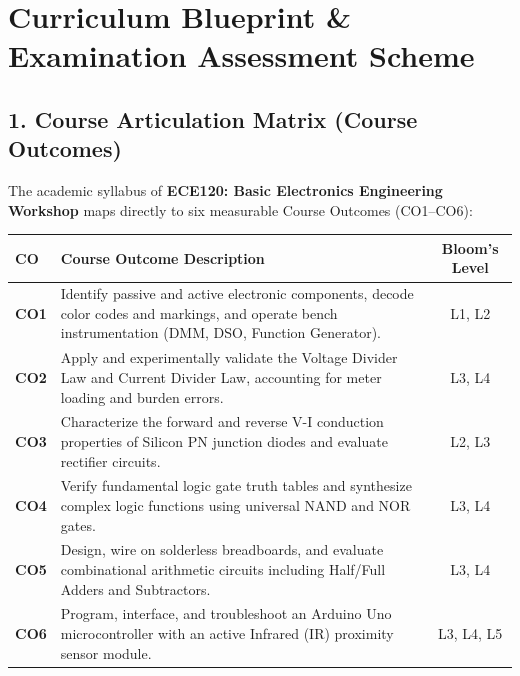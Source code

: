 \chapter*{Curriculum Blueprint \& Examination Assessment Scheme}

\section*{1. Course Articulation Matrix (Course Outcomes)}
The academic syllabus of \textbf{ECE120: Basic Electronics Engineering Workshop} maps directly to six measurable Course Outcomes (CO1--CO6):
\begin{center}
\begin{tabularx}{\textwidth}{lp{9.5cm}c}
\toprule
\textbf{CO} & \textbf{Course Outcome Description} & \textbf{Bloom's Level} \\
\midrule
\textbf{CO1} & Identify passive and active electronic components, decode color codes and markings, and operate bench instrumentation (DMM, DSO, Function Generator). & L1, L2 \\
\textbf{CO2} & Apply and experimentally validate the Voltage Divider Law and Current Divider Law, accounting for meter loading and burden errors. & L3, L4 \\
\textbf{CO3} & Characterize the forward and reverse V-I conduction properties of Silicon PN junction diodes and evaluate rectifier circuits. & L2, L3 \\
\textbf{CO4} & Verify fundamental logic gate truth tables and synthesize complex logic functions using universal NAND and NOR gates. & L3, L4 \\
\textbf{CO5} & Design, wire on solderless breadboards, and evaluate combinational arithmetic circuits including Half/Full Adders and Subtractors. & L3, L4 \\
\textbf{CO6} & Program, interface, and troubleshoot an Arduino Uno microcontroller with an active Infrared (IR) proximity sensor module. & L3, L4, L5 \\
\bottomrule
\end{tabularx}
\end{center}

